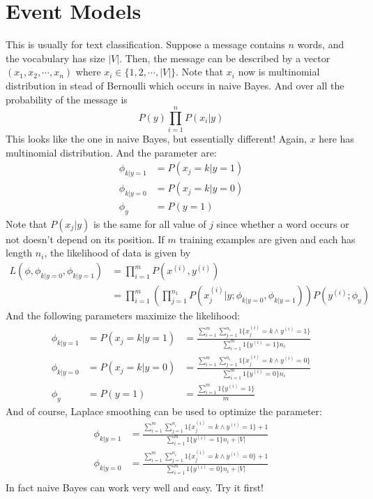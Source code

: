 \documentclass[10pt,a4paper,oneside]{article}
\begin{document}
\section{Event Models}
This is usually for text classification. Suppose a message contains $n$ words, and the vocabulary has size $|V|$. Then, the message can be described by a vector $(x_1, x_2, \cdots, x_n)$ where $x_i \in \{1, 2, \cdots, |V|\}$. Note that $x_i$ now is multinomial distribution in stead of Bernoulli which occurs in naive Bayes. And over all the probability of the message is
\[
P(y)\prod_{i=1}^{n} P(x_i|y)
\]
This looks like the one in naive Bayes, but essentially different! Again, $x$ here has multinomial distribution. And the parameter are:
\begin{align*}
\phi_{k|y=1} &= P(x_j=k| y=1)\\
\phi_{k|y=0} &= P(x_j=k| y=0)\\
\phi_y &= P(y=1)
\end{align*} 
Note that $P(x_j|y)$ is the same for all value of $j$ since whether a word occurs or not doesn't depend on its position. If $m$ training examples are given and each has length $n_i$, the likelihood of data is given by
\begin{align*}
L(\phi, \phi_{k|y=0}, \phi_{k|y=1}) &= \prod_{i=1}^{m}P(x^{(i)}, y^{(i)})\\
&= \prod_{i=1}^{m}\left(\prod_{j=1}^{n_1} P(x_j^{(i)}|y; \phi_{k|y=0},\phi_{k|y=1})\right)P(y^{(i)};\phi_y)
\end{align*} 
And the following parameters maximize the likelihood:
\begin{align*}
\phi_{k|y=1} &= P(x_j=k| y=1) &= \frac{\sum_{i=1}^{m} \sum_{j=1}^{n_i} 1\{x_j^{(i)} = k \wedge y^{(i)} =1\}}{\sum_{i=1}^{m} 1 \{y^{(i)} = 1\} n_i}\\
\phi_{k|y=0} &= P(x_j=k| y=0) &= \frac{\sum_{i=1}^{m} \sum_{j=1}^{n_i} 1\{x_j^{(i)} = k \wedge y^{(i)} =0\}}{\sum_{i=1}^{m} 1 \{y^{(i)} = 0\} n_i}\\
\phi_y &= P(y=1) &= \frac{\sum_{i=1}^{m} 1\{y^{(i)} =1\}}{m}
\end{align*} 
And of course, Laplace smoothing can be used to optimize the parameter:
\begin{align*}
\phi_{k|y=1} &= \frac{\sum_{i=1}^{m} \sum_{j=1}^{n_i} 1\{x_j^{(i)} = k \wedge y^{(i)} =1\} + 1}{\sum_{i=1}^{m} 1 \{y^{(i)} = 1\} n_i + |V|}\\
\phi_{k|y=0} &= \frac{\sum_{i=1}^{m} \sum_{j=1}^{n_i} 1\{x_j^{(i)} = k \wedge y^{(i)} =0\}+1}{\sum_{i=1}^{m} 1 \{y^{(i)} = 0\} n_i + |V|}\\
\end{align*} 
In fact naive Bayes can work very well and easy. Try it first!
\end{document}
